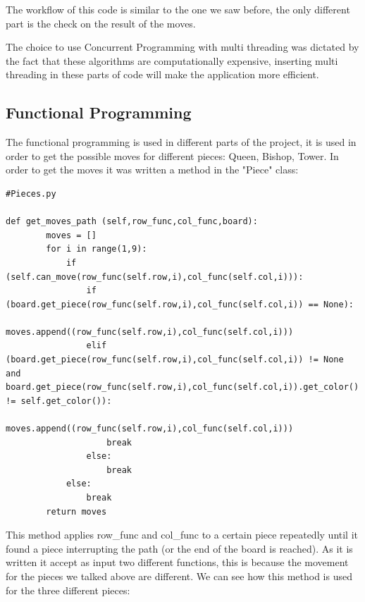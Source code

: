 \documentclass[english]{article}
\begin{document}
The workflow of this code is similar to the one we saw before, the only different part is the check on the result of the moves.

The choice to use Concurrent Programming with multi threading was dictated by the fact that these algorithms are computationally expensive, inserting multi threading in these parts of code will make the application more efficient.

\subsection{Functional Programming}
The functional programming is used in different parts of the project, it is used in order to get the possible moves for different pieces: Queen, Bishop, Tower.
In order to get the moves it was written a method in the "Piece" class:

\begin{lstlisting}
#Pieces.py

def get_moves_path (self,row_func,col_func,board):
        moves = []
        for i in range(1,9):
            if (self.can_move(row_func(self.row,i),col_func(self.col,i))):
                if (board.get_piece(row_func(self.row,i),col_func(self.col,i)) == None):
                    moves.append((row_func(self.row,i),col_func(self.col,i)))
                elif (board.get_piece(row_func(self.row,i),col_func(self.col,i)) != None and board.get_piece(row_func(self.row,i),col_func(self.col,i)).get_color() != self.get_color()):
                    moves.append((row_func(self.row,i),col_func(self.col,i)))
                    break
                else:
                    break
            else:
                break
        return moves
\end{lstlisting}

This method applies row\_func and col\_func to a certain piece repeatedly until it found a piece interrupting the path (or the end of the board is reached).
As it is written it accept as input two different functions, this is because the movement for the pieces we talked above are different.
We can see how this method is used for the three different pieces:
\end{document}
